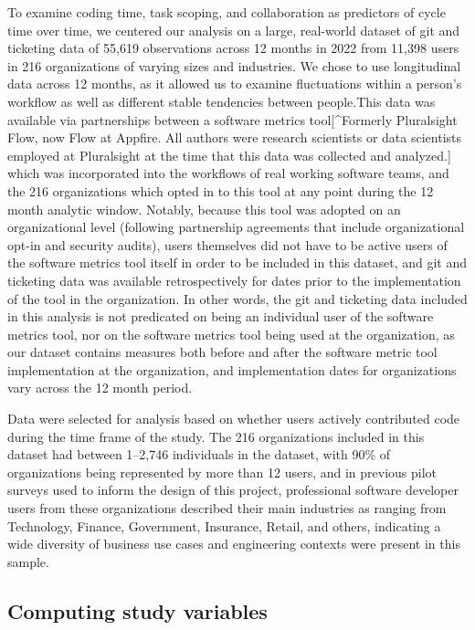 \documentclass[manuscript,screen,review]{acmart}
\begin{document}
To examine coding time, task scoping, and collaboration as predictors of
cycle time over time, we centered our analysis on a large, real-world
dataset of git and ticketing data of 55,619 observations across 12
months in 2022 from 11,398 users in 216 organizations of varying sizes
and industries. We chose to use longitudinal data across 12 months, as
it allowed us to examine fluctuations within a person's workflow as well
as different stable tendencies between people.This data was available
via partnerships between a software metrics tool{[}\^{}Formerly
Pluralsight Flow, now Flow at Appfire. All authors were research
scientists or data scientists employed at Pluralsight at the time that
this data was collected and analyzed.{]} which was incorporated into the
workflows of real working software teams, and the 216 organizations
which opted in to this tool at any point during the 12 month analytic
window. Notably, because this tool was adopted on an organizational
level (following partnership agreements that include organizational
opt-in and security audits), users themselves did not have to be active
users of the software metrics tool itself in order to be included in
this dataset, and git and ticketing data was available retrospectively
for dates prior to the implementation of the tool in the organization.
In other words, the git and ticketing data included in this analysis is
not predicated on being an individual user of the software metrics tool,
nor on the software metrics tool being used at the organization, as our
dataset contains measures both before and after the software metric tool
implementation at the organization, and implementation dates for
organizations vary across the 12 month period.

Data were selected for analysis based on whether users actively
contributed code during the time frame of the study. The 216
organizations included in this dataset had between 1--2,746 individuals
in the dataset, with 90\% of organizations being represented by more
than 12 users, and in previous pilot surveys used to inform the design
of this project, professional software developer users from these
organizations described their main industries as ranging from
Technology, Finance, Government, Insurance, Retail, and others,
indicating a wide diversity of business use cases and engineering
contexts were present in this sample.

\subsection{Computing study variables}\label{computing-study-variables}
\end{document}
